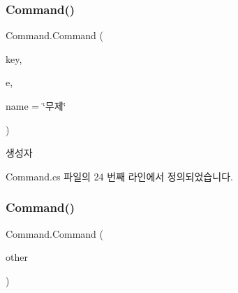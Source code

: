 \subsubsection{\texorpdfstring{Command()}{Command()}\hspace{0.1cm}{\footnotesize\ttfamily [1/2]}}
{\footnotesize\ttfamily Command.\+Command (\begin{DoxyParamCaption}\item[{Key\+Code}]{key,  }\item[{\mbox{\hyperlink{class_command_acc714b5e0de57b7f24b2619fff860b9d}{Key\+Down\+Event}}}]{e,  }\item[{string}]{name = {\ttfamily \char`\"{}무제\char`\"{}} }\end{DoxyParamCaption})\hspace{0.3cm}{\ttfamily [inline]}}



생성자 



Command.\+cs 파일의 24 번째 라인에서 정의되었습니다.


\begin{DoxyCode}{0}

\end{DoxyCode}
\mbox{\label{class_command_a71194ef9a48838bbb99793535f64eb7b}} 
\subsubsection{\texorpdfstring{Command()}{Command()}\hspace{0.1cm}{\footnotesize\ttfamily [2/2]}}
{\footnotesize\ttfamily Command.\+Command (\begin{DoxyParamCaption}\item[{\mbox{\hyperlink{class_command}{Command}}}]{other }\end{DoxyParamCaption})\hspace{0.3cm}{\ttfamily [inline]}}



